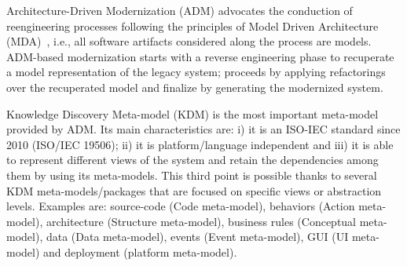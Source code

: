 





Architecture-Driven Modernization (ADM) advocates the conduction of reengineering processes following the principles of Model Driven Architecture (MDA)~\cite{1686216, Heckel2008, 7051941, IRIDurelliCatalogo}, i.e., all software artifacts considered along the process are models. ADM-based modernization starts with a reverse engineering phase to recuperate a model representation of the legacy system; proceeds by applying refactorings over the recuperated model and finalize by generating the modernized system.

Knowledge Discovery Meta-model (KDM) is the most important meta-model provided by ADM. Its main characteristics are: i) it is an ISO-IEC standard since 2010 (ISO/IEC 19506); ii) it is platform/language independent and iii) it is able to represent different views of the system and retain the dependencies among them by using its meta-models. This third point is possible thanks to several KDM meta-models/packages that are focused on specific views or abstraction levels. Examples are:  source-code (Code meta-model), behaviors (Action meta-model), architecture (Structure meta-model), business rules (Conceptual meta-model), data (Data meta-model), events (Event meta-model), GUI (UI meta-model) and deployment (platform meta-model).  

